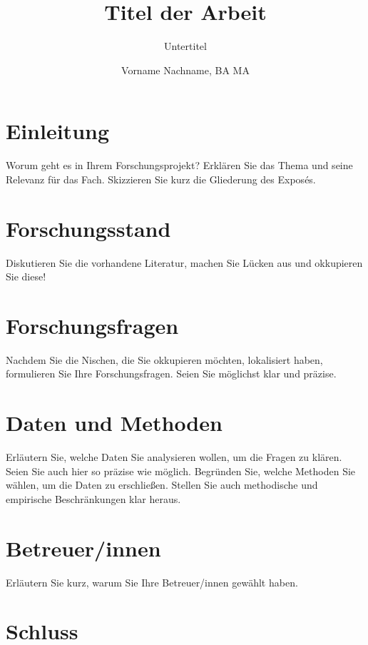 \documentclass[naustrian]{univie-ling-expose}
\author{Vorname Nachname, BA MA}
\title{Titel der Arbeit}
\subtitle{Untertitel}
\begin{document}
\maketitle

\tableofcontents

\section{Einleitung}\label{sec:einleitung}

Worum geht es in Ihrem Forschungsprojekt? Erklären Sie das Thema und seine Relevanz für das Fach.
Skizzieren Sie kurz die Gliederung des Exposés.


\section{Forschungsstand}\label{sec:forschungsstand}

Diskutieren Sie die vorhandene Literatur, machen Sie Lücken aus und okkupieren Sie diese!


\section{Forschungsfragen}\label{sec:forschungsfragen}

Nachdem Sie die Nischen, die Sie okkupieren möchten, lokalisiert haben, formulieren Sie Ihre Forschungsfragen.
Seien Sie möglichst klar und präzise. 


\section{Daten und Methoden}\label{sec:daten}

Erläutern Sie, welche Daten Sie analysieren wollen, um die Fragen zu klären. Seien Sie auch hier so präzise wie möglich.
Begründen Sie, welche Methoden Sie wählen, um die Daten zu erschließen. Stellen Sie auch methodische und empirische
Beschränkungen klar heraus.


\section{Betreuer/innen}\label{sec:betreuer}

Erläutern Sie kurz, warum Sie Ihre Betreuer/innen gewählt haben. 


\section{Schluss}\label{sec:schluss}
\end{document}
